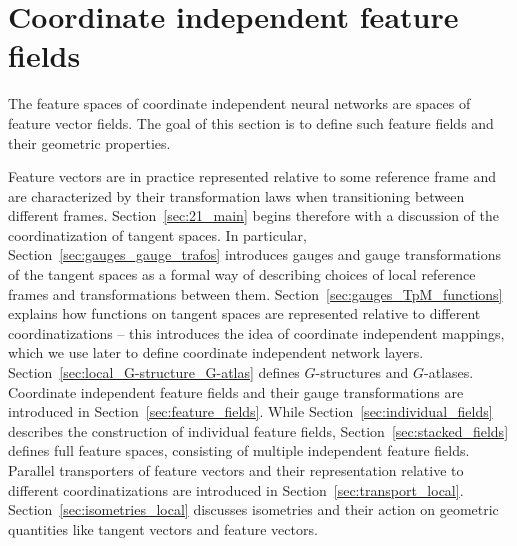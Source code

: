 

\section{Coordinate independent feature fields}
\label{sec:gauge_cnns_intro_local}

The feature spaces of coordinate independent neural networks are spaces of feature vector fields.
The goal of this section is to define such feature fields and their geometric properties.

\etocsettocstyle{}{} %
\localtableofcontents

Feature vectors are in practice represented relative to some reference frame and are characterized by their transformation laws when transitioning between different frames.
Section~\ref{sec:21_main} begins therefore with a discussion of the coordinatization of tangent spaces.
In particular, Section~\ref{sec:gauges_gauge_trafos} introduces gauges and gauge transformations of the tangent spaces as a formal way of describing choices of local reference frames and transformations between them.
Section~\ref{sec:gauges_TpM_functions} explains how functions on tangent spaces are represented relative to different coordinatizations
-- this introduces the idea of coordinate independent mappings, which we use later to define coordinate independent network layers.
Section~\ref{sec:local_G-structure_G-atlas} defines $G$-structures and $G$-atlases.
Coordinate independent feature fields and their gauge transformations are introduced in Section~\ref{sec:feature_fields}.
While Section~\ref{sec:individual_fields} describes the construction of individual feature fields,
Section~\ref{sec:stacked_fields} defines full feature spaces, consisting of multiple independent feature fields.
Parallel transporters of feature vectors and their representation relative to different coordinatizations are introduced in Section~\ref{sec:transport_local}.
Section~\ref{sec:isometries_local} discusses isometries and their action on geometric quantities like tangent vectors and feature vectors.

